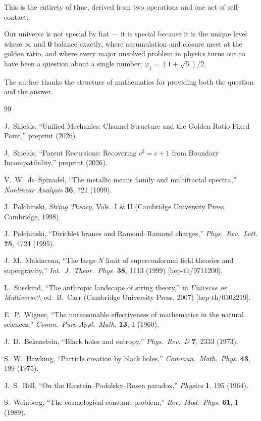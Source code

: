 \documentclass[prd,twocolumn,preprintnumbers,amsmath,amssymb]{revtex4-2}
\newcommand{\acc}{\mathbf{\infty}}
\newcommand{\inv}{\mathbf{0}}
\begin{document}
This is the entirety of time, derived from two operations and
one act of self-contact.

Our universe is not special by fiat --- it is special because
it is the unique level where $\acc$ and $\inv$ balance exactly,
where accumulation and closure meet at the golden ratio, and
where every major unsolved problem in physics turns out to have
been a question about a single number:
$\varphi_1 = (1+\sqrt{5})/2$.

\begin{acknowledgments}
The author thanks the structure of mathematics for providing both
the question and the answer.
\end{acknowledgments}

\begin{thebibliography}{99}

J.~Shields,
``Unified Mechanics: Channel Structure and the Golden Ratio Fixed Point,''
preprint (2026).

J.~Shields,
``Parent Recursions: Recovering $c^2=c+1$ from Boundary Incompatibility,''
preprint (2026).

V.~W.\ de~Spinadel,
``The metallic means family and multifractal spectra,''
\textit{Nonlinear Analysis} \textbf{36}, 721 (1999).

J.~Polchinski,
\textit{String Theory}, Vols.~I \& II
(Cambridge University Press, Cambridge, 1998).

J.~Polchinski,
``Dirichlet branes and Ramond--Ramond charges,''
\textit{Phys.\ Rev.\ Lett.} \textbf{75}, 4724 (1995).

J.~M.~Maldacena,
``The large-$N$ limit of superconformal field theories and supergravity,''
\textit{Int.\ J.~Theor.\ Phys.} \textbf{38}, 1113 (1999)
[hep-th/9711200].

L.~Susskind,
``The anthropic landscape of string theory,''
in \textit{Universe or Multiverse?}, ed.\ B.~Carr
(Cambridge University Press, 2007)
[hep-th/0302219].

E.~P.~Wigner,
``The unreasonable effectiveness of mathematics in the natural sciences,''
\textit{Comm.\ Pure Appl.\ Math.} \textbf{13}, 1 (1960).

J.~D.~Bekenstein,
``Black holes and entropy,''
\textit{Phys.\ Rev.\ D} \textbf{7}, 2333 (1973).

S.~W.~Hawking,
``Particle creation by black holes,''
\textit{Commun.\ Math.\ Phys.} \textbf{43}, 199 (1975).

J.~S.~Bell,
``On the Einstein--Podolsky--Rosen paradox,''
\textit{Physics} \textbf{1}, 195 (1964).

S.~Weinberg,
``The cosmological constant problem,''
\textit{Rev.\ Mod.\ Phys.} \textbf{61}, 1 (1989).

\end{thebibliography}
\end{document}
